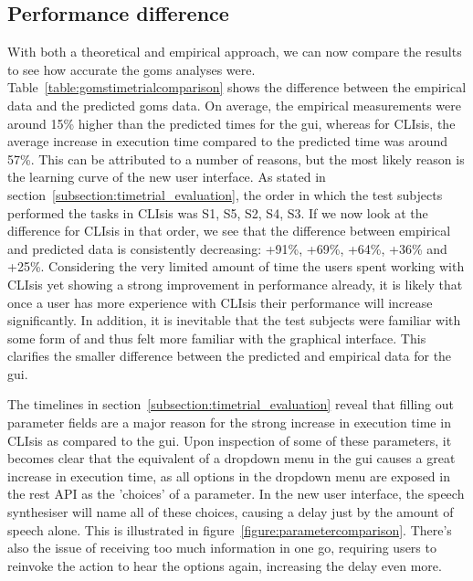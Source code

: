 \subsection{Performance difference}
\label{subsection:performancedifference}
With both a theoretical and empirical approach, we can now compare the results to see how accurate the \acrshort{goms} analyses were. Table~\ref{table:gomstimetrialcomparison} shows the difference between the empirical data and the predicted \acrshort{goms} data. On average, the empirical measurements were around 15\% higher than the predicted times for the \acrshort{gui}, whereas for CLIsis, the average increase in execution time compared to the predicted time was around 57\%. This can be attributed to a number of reasons, but the most likely reason is the learning curve of the new user interface. As stated in section~\ref{subsection:timetrial_evaluation}, the order in which the test subjects performed the tasks in CLIsis was S1, S5, S2, S4, S3. If we now look at the difference for CLIsis in that order, we see that the difference between empirical and predicted data is consistently decreasing: +91\%, +69\%, +64\%, +36\% and +25\%. Considering the very limited amount of time the users spent working with CLIsis yet showing a strong improvement in performance already, it is likely that once a user has more experience with CLIsis their performance will increase significantly. In addition, it is inevitable that the test subjects were familiar with some form of  and thus felt more familiar with the graphical interface. This clarifies the smaller difference between the predicted and empirical data for the \acrshort{gui}.

The timelines in section~\ref{subsection:timetrial_evaluation} reveal that filling out parameter fields are a major reason for the strong increase in execution time in CLIsis as compared to the \acrshort{gui}. Upon inspection of some of these parameters, it becomes clear that the equivalent of a dropdown menu in the \acrshort{gui} causes a great increase in execution time, as all options in the dropdown menu are exposed in the \acrshort{rest} API as the 'choices' of a parameter. In the new user interface, the speech synthesiser will name all of these choices, causing a delay just by the amount of speech alone. This is illustrated in figure~\ref{figure:parametercomparison}. There's also the issue of receiving too much information in one go, requiring users to reinvoke the action to hear the options again, increasing the delay even more.

